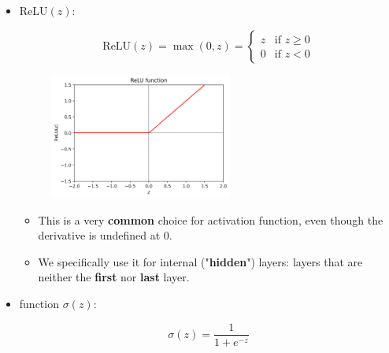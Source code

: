 \begin{itemize}
            
            \item {} ReLU$(z)$:
            
                \begin{equation}
                    \text{ReLU}(z) 
                    =
                    \max(0,z)
                    =
                    \begin{cases}
                      z & \text{if $z \geq 0$}\\
                      0 & \text{if $z < 0$}
                    \end{cases}
                \end{equation}
                
                \begin{figure}[H]
                    \centering
                    \includegraphics[width=60mm,scale=0.4]{images/nn_images/relu_fn.png}
                \end{figure}
                
                \begin{itemize}
                    \item This is a very \textbf{common} choice for activation function, even though the derivative is undefined at 0.
                    
                    \item We specifically use it for internal ("\textbf{hidden}") layers: layers that are neither the \textbf{first} nor \textbf{last} layer.
                \end{itemize}
            
            
            \item {} function $\sigma(z)$:
            
                \begin{equation}
                    \sigma(z) = \frac{1}{1+e^{-z}}
                \end{equation}
                

\end{itemize}
